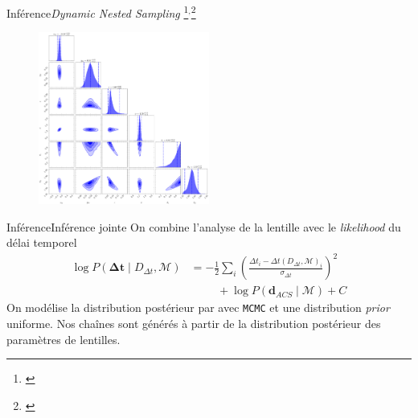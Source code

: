\documentclass{beamer}
\begin{document}
\begin{frame}{Inférence}{\textit{Dynamic Nested Sampling}
        \footnote{\citet{Skilling2006}}$^{,}$\footnote{\citet{Higson2017}}}
        \begin{figure}[H]
                \centering
                \includegraphics[width=0.5\textwidth]{corner_plot}
        \end{figure}
         
\end{frame}

\begin{frame}{Inférence}{Inférence jointe}
        On combine l'analyse de la lentille avec le \textit{likelihood} du délai 
        temporel
        \begin{align}\label{eq:LikTimeDelay}
                \log P(\boldsymbol{ \Delta}\mathbf{t} \mid D_{\Delta t}, \mathcal{M}) 
                &= -\frac{1}{2}\sum_i \left( \frac{\Delta t_i -
                \Delta t(D_{\Delta t}, \mathcal{M})_i}{\sigma_{\Delta t}} \right)^2  \\\nonumber
                &\hspace{1cm}
                + \log P(\mathbf{d}_{ACS} \mid \mathcal{M}) + C
        \end{align} 
        On modélise la distribution postérieur par avec \texttt{MCMC} 
        et une distribution 
        \textit{prior} uniforme. Nos chaînes sont générés à partir 
        de la distribution postérieur des paramètres de lentilles.
        
\end{frame}
\end{document}
